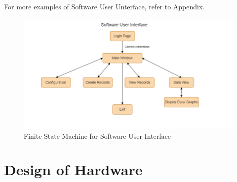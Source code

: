 \documentclass[12pt, titlepage]{article}
\begin{document}
For more examples of Software User Unterface, refer to Appendix.

\begin{figure}[H]
	\begin{center}
		 \includegraphics[width=1\textwidth]{SoftwareUI_FSM}
		\caption{Finite State Machine for Software User Interface}
		\label{SoftwareUI_FSM} 
	\end{center}
\end{figure}


\section{Design of Hardware}
\end{document}

